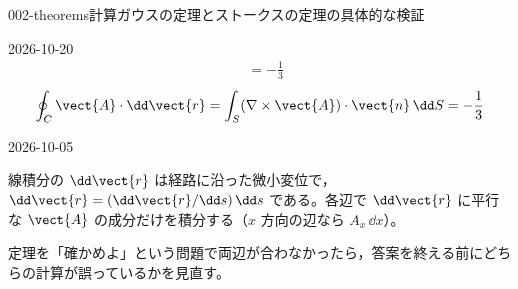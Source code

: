 \documentclass[uplatex,dvipdfmx,a4paper,11pt]{jsarticle}
\begin{document}
\begin{mondai}{002-theorems}{計算}{ガウスの定理とストークスの定理の具体的な検証}
\begin{kotaeutsushi}{2026-10-20}
\begin{align*}
&=-\frac{1}{3}
\end{align*}
\[ \oint_{C}\vect{A}\cdot\dd\vect{r}=\int_{S}(\nabla\times\vect{A})\cdot\vect{n}\,\dd S=-\frac{1}{3} \]
\end{kotaeutsushi}
\begin{maekizuki}{2026-10-05}
\item 線積分の $\dd\vect{r}$ は経路に沿った微小変位で，$\dd\vect{r}=(\dd\vect{r}/\dd s)\,\dd s$ である。各辺で $\dd\vect{r}$ に平行な $\vect{A}$ の成分だけを積分する（$x$ 方向の辺なら $A_{x}\,\dd x$）。
\item 定理を「確かめよ」という問題で両辺が合わなかったら，答案を終える前にどちらの計算が誤っているかを見直す。
\end{maekizuki}
\end{mondai}

\noteowari
\end{document}
